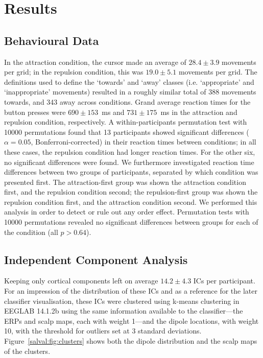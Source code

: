 \section{Results}

\subsection{Behavioural Data}

In the attraction condition, the cursor made an average of $28.4\pm3.9$ movements per grid; in the repulsion condition, this was $19.0\pm5.1$ movements per grid. The definitions used to define the `towards' and `away' classes (i.e. `appropriate' and `inappropriate' movements) resulted in a roughly similar total of 388 movements towards, and 343 away across conditions. Grand average reaction times for the button presses were $690\pm153$~ms and $731\pm175$~ms in the attraction and repulsion condition, respectively. A within-participants permutation test with 10000 permutations found that 13 participants showed significant differences ($\alpha=0.05$, Bonferroni-corrected) in their reaction times between conditions; in all these cases, the repulsion condition had longer reaction times. For the other six, no significant differences were found. We furthermore investigated reaction time differences between two groups of participants, separated by which condition was presented first. The attraction-first group was shown the attraction condition first, and the repulsion condition second; the repulsion-first group was shown the repulsion condition first, and the attraction condition second. We performed this analysis in order to detect or rule out any order effect. Permutation tests with 10000 permutations revealed no significant differences between groups for each of the condition (all $p>0.64$).


\subsection{Independent Component Analysis}

Keeping only cortical components left on average $14.2\pm4.3$ ICs per participant. For an impression of the distribution of these ICs and as a reference for the later classifier visualisation, these ICs were clustered using k-means clustering in EEGLAB 14.1.2b \cite{delorme2004eeglab} using the same information available to the classifier---the ERPs and scalp maps, each with weight 1---and the dipole locations, with weight 10, with the threshold for outliers set at 3 standard deviations. Figure~\ref{salval:fig:clusters} shows both the dipole distribution and the scalp maps of the clusters.

